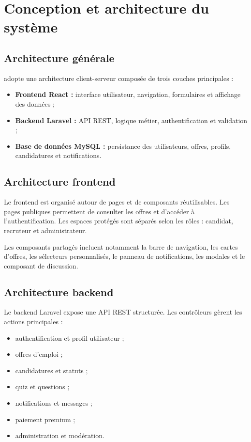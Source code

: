 \chapter{Conception et architecture du système}

\section{Architecture générale}

\noindent
\projectName{} adopte une architecture client-serveur composée de trois couches principales :

\begin{itemize}
    \item \textbf{Frontend React :} interface utilisateur, navigation, formulaires et affichage des données ;
    \item \textbf{Backend Laravel :} API REST, logique métier, authentification et validation ;
    \item \textbf{Base de données MySQL :} persistance des utilisateurs, offres, profils, candidatures et notifications.
\end{itemize}


\section{Architecture frontend}

\noindent
Le frontend est organisé autour de pages et de composants réutilisables. Les pages publiques permettent de consulter les offres et d'accéder à l'authentification. Les espaces protégés sont séparés selon les rôles : candidat, recruteur et administrateur.

\noindent
Les composants partagés incluent notamment la barre de navigation, les cartes d'offres, les sélecteurs personnalisés, le panneau de notifications, les modales et le composant de discussion.

\section{Architecture backend}

\noindent
Le backend Laravel expose une API REST structurée. Les contrôleurs gèrent les actions principales :

\begin{itemize}
    \item authentification et profil utilisateur ;
    \item offres d'emploi ;
    \item candidatures et statuts ;
    \item quiz et questions ;
    \item notifications et messages ;
    \item paiement premium ;
    \item administration et modération.
\end{itemize}

